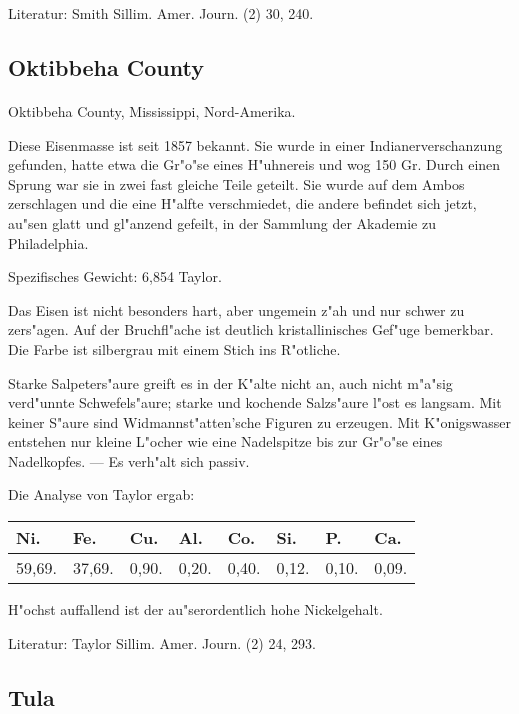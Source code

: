 \documentclass[a4paper, 11pt, oneside]{article}
\begin{document}
\footnotesize
Literatur: Smith Sillim. Amer. Journ. (2) 30, 240.

\subsection{Oktibbeha County}
\normalsize
\paragraph{}
Oktibbeha County, Mississippi, Nord-Amerika.

Diese Eisenmasse ist seit 1857 bekannt. Sie wurde in einer Indianerverschanzung gefunden, hatte etwa die Gr"o"se eines H"uhnereis und wog 150 Gr. Durch einen Sprung war sie in zwei fast gleiche Teile geteilt. Sie wurde auf dem Ambos zerschlagen und die eine H"alfte verschmiedet, die andere befindet sich jetzt, au"sen glatt und gl"anzend gefeilt, in der Sammlung der Akademie zu Philadelphia.

Spezifisches Gewicht: 6,854 Taylor.

Das Eisen ist nicht besonders hart, aber ungemein z"ah und nur schwer zu zers"agen. Auf der Bruchfl"ache ist deutlich kristallinisches Gef"uge bemerkbar. Die Farbe ist silbergrau mit einem Stich ins R"otliche.

Starke Salpeters"aure greift es in der K"alte nicht an, auch nicht m"a"sig verd"unnte Schwefels"aure; starke und kochende Salzs"aure l"ost es langsam. Mit keiner S"aure sind Widmannst"atten'sche Figuren zu erzeugen. Mit K"onigswasser entstehen nur kleine L"ocher wie eine Nadelspitze bis zur Gr"o"se eines Nadelkopfes. --- Es verh"alt sich passiv.

Die Analyse von Taylor ergab:
\begin{table}[H]
    \centering
    \begin{tabular}{l l l l l l l l}
        Ni. & Fe. & Cu. & Al. & Co. & Si. & P. & Ca. \\ \hline
        59,69. & 37,69. & 0,90. & 0,20. & 0,40. & 0,12. & 0,10. & 0,09. \\
    \end{tabular}
\end{table}

H"ochst auffallend ist der au"serordentlich hohe Nickelgehalt.

\footnotesize
Literatur: Taylor Sillim. Amer. Journ. (2) 24, 293.

\subsection{Tula}
\normalsize
\end{document}
